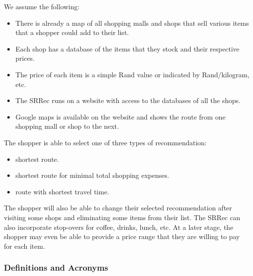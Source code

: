 \documentclass[10pt,twocolumn]{witseiepaper}
\begin{document}
			We assume the following:
			\begin{itemize}
				\item There is already a map of all shopping malls and shops that sell various items that a shopper could add to their list.
				\item Each shop has a database of the items that they stock and their respective prices.
				\item The price of each item is a simple Rand value or indicated by Rand/kilogram, etc.
				\item The SRRec runs on a website with access to the databases of all the shops.
				\item Google maps is available on the website and shows the route from one shopping mall or shop to the next.
			\end{itemize}
			
			The shopper is able to select one of three types of recommendation:
			\begin{itemize}
				\item shortest route.
				\item shortest route for minimal total shopping expenses.
				\item route with shortest travel time.
			\end{itemize}
			
			The shopper will also be able to change their selected recommendation after visiting some shops and eliminating some items from their list. The SRRec can also incorporate stop-overs for coffee, drinks, lunch, etc. At a later stage, the shopper may even be able to provide a price range that they are willing to pay for each item.
			
		\subsubsection{Definitions and Acronyms}
		
\end{document}
